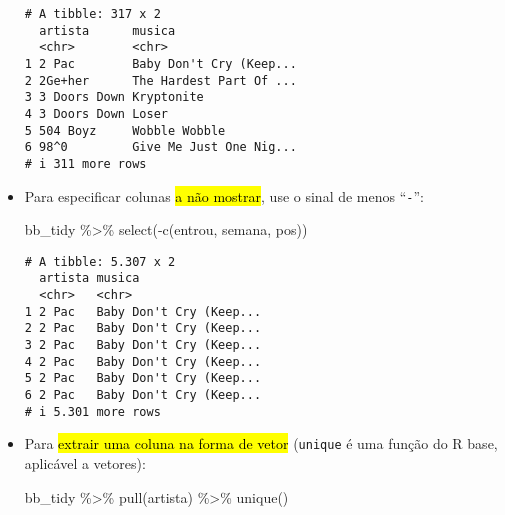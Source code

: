\documentclass[
  letterpaper,
  DIV=11,
  numbers=noendperiod]{scrreprt}
\newenvironment{Shaded}{\begin{snugshade}}{\end{snugshade}}
\newcommand{\FunctionTok}[1]{\textcolor[rgb]{0.28,0.35,0.67}{#1}}
\newcommand{\NormalTok}[1]{\textcolor[rgb]{0.00,0.23,0.31}{#1}}
\newcommand{\SpecialCharTok}[1]{\textcolor[rgb]{0.37,0.37,0.37}{#1}}
\begin{document}
\begin{itemize}
\begin{verbatim}
# A tibble: 317 x 2
  artista      musica                 
  <chr>        <chr>                  
1 2 Pac        Baby Don't Cry (Keep...
2 2Ge+her      The Hardest Part Of ...
3 3 Doors Down Kryptonite             
4 3 Doors Down Loser                  
5 504 Boyz     Wobble Wobble          
6 98^0         Give Me Just One Nig...
# i 311 more rows
\end{verbatim}
\item
  Para especificar colunas {\hl{a não mostrar}}, use o sinal de menos
  ``\texttt{-}'':

\begin{Shaded}
\begin{Highlighting}[]
\NormalTok{bb\_tidy }\SpecialCharTok{\%\textgreater{}\%} 
  \FunctionTok{select}\NormalTok{(}\SpecialCharTok{{-}}\FunctionTok{c}\NormalTok{(entrou, semana, pos))}
\end{Highlighting}
\end{Shaded}

\begin{verbatim}
# A tibble: 5.307 x 2
  artista musica                 
  <chr>   <chr>                  
1 2 Pac   Baby Don't Cry (Keep...
2 2 Pac   Baby Don't Cry (Keep...
3 2 Pac   Baby Don't Cry (Keep...
4 2 Pac   Baby Don't Cry (Keep...
5 2 Pac   Baby Don't Cry (Keep...
6 2 Pac   Baby Don't Cry (Keep...
# i 5.301 more rows
\end{verbatim}
\item
  Para {\hl{extrair uma coluna na forma de vetor}} (\texttt{unique} é
  uma função do R base, aplicável a vetores):

\begin{Shaded}
\begin{Highlighting}[]
\NormalTok{bb\_tidy }\SpecialCharTok{\%\textgreater{}\%} 
  \FunctionTok{pull}\NormalTok{(artista) }\SpecialCharTok{\%\textgreater{}\%} 
  \FunctionTok{unique}\NormalTok{()}
\end{Highlighting}
\end{Shaded}


\end{itemize}
\end{document}
